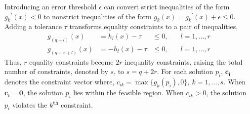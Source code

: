 \documentclass[10pt]{article}
\begin{document}
Introducing an error threshold $\epsilon$ can convert strict inequalities of the form ${g_k}^{\prime}(x) < 0$ to
nonstrict inequalities of the form $g_k(x) = {g_k}^{\prime}(x) + \epsilon \leq 0$. Adding a tolerance $\tau$ transforms
equality constraints to a pair of inequalities,
\begin{equation*}
  \begin{aligned}
    g_{(q+l)}(x) &= h_l(x) - \tau &\leq 0,&\quad l = 1,\dots,r\\
    g_{(q+r+l)}(x) &= {-}h_l(x) - \tau &\leq 0,&\quad l = 1,\dots,r
  \end{aligned}
\end{equation*}
Thus, $r$ equality constraints become $2r$ inequality constraints, raising the total number of constraints, denoted by
$s$, to $s = q + 2r$. For each solution $p_i$, $\bm{c_i}$ denotes the constraint vector where, $c_{ik} = \max\{g_k(p_i),
0\},~k=1,\dots,s$. When $\bm{c_i} = \bm{0}$, the solution $p_i$ lies within the feasible region. When $c_{ik} > 0$, the
solution $p_i$ violates the $k$\textsuperscript{th} constraint.
\end{document}
